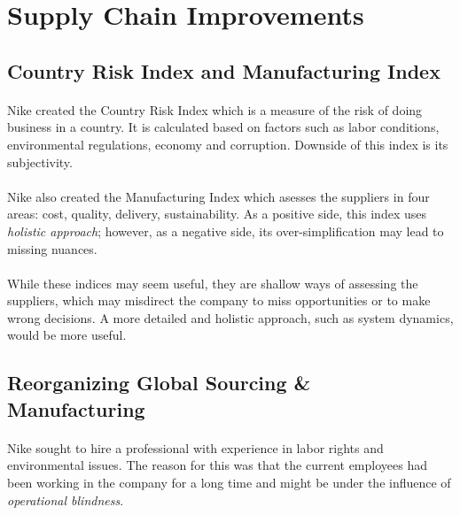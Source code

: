 \section{Supply Chain Improvements}

\subsection{Country Risk Index and Manufacturing Index}

\paragraph{} Nike created the Country Risk Index which is a measure of the risk of doing business in a country. It is calculated based on factors such as labor conditions, environmental regulations, economy and corruption. Downside of this index is its subjectivity.

\paragraph{} Nike also created the Manufacturing Index which asesses the suppliers in four areas: cost, quality, delivery, sustainability. As a positive side, this index uses \textit{holistic approach}; however, as a negative side, its over-simplification may lead to missing nuances.

\paragraph{} While these indices may seem useful, they are shallow ways of assessing the suppliers, which may misdirect the company to miss opportunities or to make wrong decisions. A more detailed and holistic approach, such as system dynamics, would be more useful. 

\subsection{Reorganizing Global Sourcing \& Manufacturing}

\paragraph{} Nike sought to hire a professional with experience in labor rights and environmental issues. The reason for this was that the current employees had been working in the company for a long time and might be under the influence of \textit{operational blindness}.
